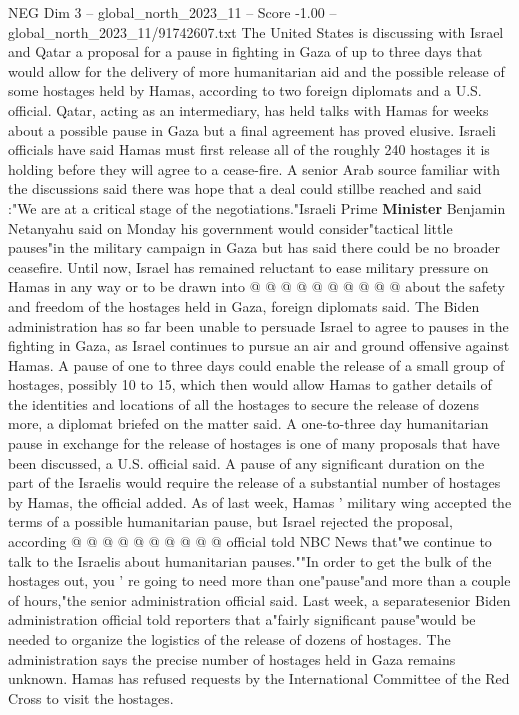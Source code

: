 \begin{textsample}{NEG Dim 3 – global\_north\_2023\_11 – Score -1.00 – global\_north\_2023\_11/91742607.txt}  \label{ex:f3_neg_284}
The United States is discussing with Israel and Qatar a proposal for a pause in fighting in Gaza of up to three days that would allow for the delivery of more humanitarian aid and the possible release of some hostages held by Hamas, according to two foreign diplomats and a U.S. official.
Qatar, acting as an intermediary, has held talks with Hamas for weeks about a possible pause in Gaza but a final agreement has proved elusive.
Israeli officials have said Hamas must first release all of the roughly 240 hostages it is holding before they will agree to a cease-fire.
A senior Arab source familiar with the discussions said there was hope that a deal could stillbe reached and said :"We are at a critical stage of the negotiations."Israeli Prime \textbf{Minister} Benjamin Netanyahu said on Monday his government would consider"tactical little pauses"in the military campaign in Gaza but has said there could be no broader ceasefire.
Until now, Israel has remained reluctant to ease military pressure on Hamas in any way or to be drawn into @ @ @ @ @ @ @ @ @ @ about the safety and freedom of the hostages held in Gaza, foreign diplomats said.
The Biden administration has so far been unable to persuade Israel to agree to pauses in the fighting in Gaza, as Israel continues to pursue an air and ground offensive against Hamas.
A pause of one to three days could enable the release of a small group of hostages, possibly 10 to 15, which then would allow Hamas to gather details of the identities and locations of all the hostages to secure the release of dozens more, a diplomat briefed on the matter said.
A one-to-three day humanitarian pause in exchange for the release of hostages is one of many proposals that have been discussed, a U.S. official said.
A pause of any significant duration on the part of the Israelis would require the release of a substantial number of hostages by Hamas, the official added.
As of last week, Hamas ' military wing accepted the terms of a possible humanitarian pause, but Israel rejected the proposal, according @ @ @ @ @ @ @ @ @ @ official told NBC News that"we continue to talk to the Israelis about humanitarian pauses.""In order to get the bulk of the hostages out, you ' re going to need more than one"pause"and more than a couple of hours,"the senior administration official said.
Last week, a separatesenior Biden administration official told reporters that a"fairly significant pause"would be needed to organize the logistics of the release of dozens of hostages.
The administration says the precise number of hostages held in Gaza remains unknown.
Hamas has refused requests by the International Committee of the Red Cross to visit the hostages.

\end{textsample}
